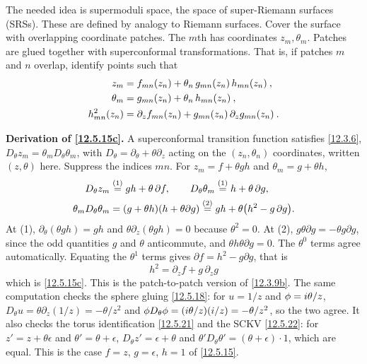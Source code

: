 The needed idea is supermoduli space, the space of super-Riemann surfaces (SRSs). These are defined by analogy to Riemann surfaces. Cover the surface with overlapping coordinate patches. The $m$th has coordinates $z_m, \theta_m$. Patches are glued together with superconformal transformations. That is, if patches $m$ and $n$ overlap, identify points such that
\begin{subequations} \label{12.5.15}
	\begin{align}
		z_m &= f_{mn}(z_n) + \theta_n\,g_{mn}(z_n)\,h_{mn}(z_n) \:, \label{12.5.15a} \\
		\theta_m &= g_{mn}(z_n) + \theta_n\,h_{mn}(z_n) \:, \label{12.5.15b} \\
		h_{mn}^2(z_n) &= \partial_z f_{mn}(z_n) + g_{mn}(z_n)\,\partial_z g_{mn}(z_n) \:. \label{12.5.15c}
	\end{align}
\end{subequations}
\begin{tcolorbox}[breakable]
	\begin{remark}
		\textbf{Derivation of \eqref{12.5.15c}.} A superconformal transition function satisfies \eqref{12.3.6}, $D_{\theta}z_{m}=\theta_{m}D_{\theta}\theta_{m}$, with $D_{\theta}=\partial_{\theta}+\theta\partial_{z}$ acting on the $(z_{n},\theta_{n})$ coordinates, written $(z,\theta)$ here. Suppress the indices $mn$. For $z_{m}=f+\theta gh$ and $\theta_{m}=g+\theta h$,
		\begin{align*}
			D_{\theta}z_{m}&\overset{(1)}{=} gh+\theta\,\partial f ,\qquad
			D_{\theta}\theta_{m}\overset{(1)}{=} h+\theta\,\partial g ,\\
			\theta_{m}D_{\theta}\theta_{m}&=(g+\theta h)(h+\theta\partial g)
			\overset{(2)}{=} gh+\theta\bigl(h^{2}-g\,\partial g\bigr) .
		\end{align*}
		At (1), $\partial_{\theta}(\theta gh)=gh$ and $\theta\partial_{z}(\theta gh)=0$ because $\theta^{2}=0$. At (2), $g\theta\partial g=-\theta g\partial g$, since the odd quantities $g$ and $\theta$ anticommute, and $\theta h\theta\partial g=0$. The $\theta^{0}$ terms agree automatically. Equating the $\theta^{1}$ terms gives $\partial f=h^{2}-g\partial g$, that is
		\[
		\boxed{\;h^{2}=\partial_{z}f+g\,\partial_{z}g\;}
		\]
		which is \eqref{12.5.15c}. This is the patch-to-patch version of \eqref{12.3.9b}. The same computation checks the sphere gluing \eqref{12.5.18}: for $u=1/z$ and $\phi=i\theta/z$, $D_{\theta}u=\theta\partial_{z}(1/z)=-\theta/z^{2}$ and $\phi D_{\theta}\phi=(i\theta/z)(i/z)=-\theta/z^{2}$, so the two agree. It also checks the torus identification \eqref{12.5.21} and the SCKV \eqref{12.5.22}: for $z'=z+\theta\epsilon$ and $\theta'=\theta+\epsilon$, $D_{\theta}z'=\epsilon+\theta$ and $\theta'D_{\theta}\theta'=(\theta+\epsilon)\cdot1$, which are equal. This is the case $f=z$, $g=\epsilon$, $h=1$ of \eqref{12.5.15}.
	\end{remark}
\end{tcolorbox}

